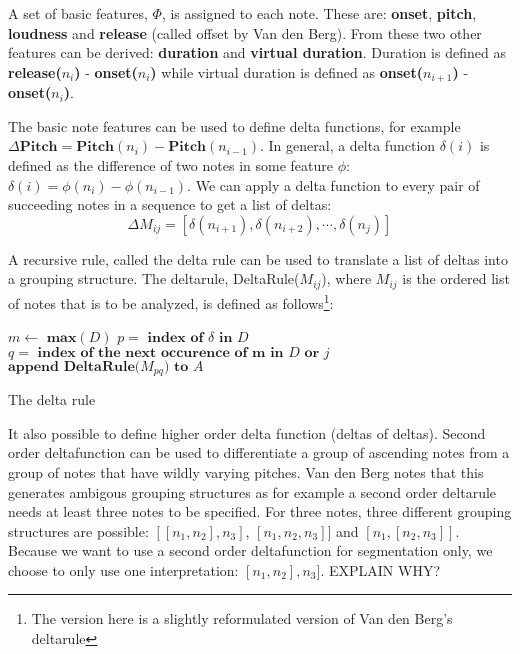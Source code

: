 \documentclass[a4paper,10pt]{article}
\begin{document}
A set of basic features, $\Phi$, is assigned to each note. These are: \textbf{onset}, \textbf{pitch}, \textbf{loudness} and \textbf{release} (called offset by Van den Berg). From these two other features can be derived: \textbf{duration} and \textbf{virtual duration}. Duration is defined as \textbf{release($n_i$)} - \textbf{onset($n_i$)} while virtual duration is defined as \textbf{onset($n_{i+1}$)} - \textbf{onset($n_i$)}. 

The basic note features can be used to define delta functions, for example $\Delta\textbf{Pitch} = \textbf{Pitch}(n_i) - \textbf{Pitch}(n_{i-1})$. In general, a delta function $\delta(i)$ is defined as the difference of two notes in some feature $\phi$: $\delta(i) = \phi(n_i) - \phi(n_{i-1})$. We can apply a delta function to every pair of succeeding notes in a sequence to get a list of deltas: 
\[\Delta M_{ij} = [\delta(n_{i+1}), \delta(n_{i+2}), \cdots, \delta(n_{j})]\]

A recursive rule, called the delta rule can be used to translate a list of deltas into a grouping structure. The deltarule, DeltaRule($M_{ij}$), where $M_{ij}$ is the ordered list of notes that is to be analyzed, is defined as follows\footnote{The version here is a slightly reformulated version of Van den Berg's deltarule}:
\begin{algorithm}
\begin{algorithmic}
\STATE $m \leftarrow \textbf{ max}(D)$
\STATE $p = \textbf{ index of }\delta \textbf{ in } D$
\STATE $q = \textbf{ index of the next occurence of m in }D \textbf{ or } j$
\STATE $\textbf{append DeltaRule(}M_{pq}\textbf{) to } A$
\ENDIF
\ENDFOR
{}
\end{algorithmic}
\caption{The delta rule}
\label{deltarule}
\end{algorithm}

It also possible to define higher order delta function (deltas of deltas). Second order deltafunction can be used to differentiate a group of ascending notes from a group of notes that have wildly varying pitches. Van den Berg notes that this generates ambigous grouping structures as for example a second order deltarule needs at least three notes to be specified. For three notes, three different grouping structures are possible: $[[n_1, n_2], n_3]$, $[n_1, n_2, n_3]]$ and $[n_1, [n_2, n_3]]$. Because we want to use a second order deltafunction for segmentation only, we choose to only use one interpretation: $[n_1, n_2], n_3]$. EXPLAIN WHY?
\end{document}
